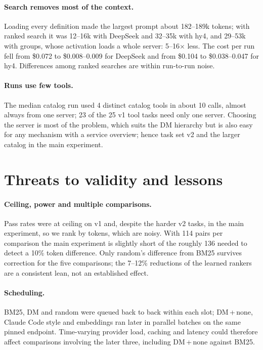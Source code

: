 \documentclass[11pt]{article}
\newcommand{\dmn}{DM\,+\,none}
\begin{document}
\paragraph{Search removes most of the context.} Loading every definition made the largest prompt about 182--189k
tokens; with ranked search it was 12--16k with DeepSeek and 32--35k with hy4, and 29--53k with groups, whose
activation loads a whole server: 5--16$\times$ less. The cost per run fell from \$0.072 to \$0.008--0.009 for
DeepSeek and from \$0.104 to \$0.038--0.047 for hy4. Differences among ranked searches are within run-to-run
noise.

\paragraph{Runs use few tools.} The median catalog run used 4 distinct catalog tools in about 10 calls, almost
always from one server; 23 of the 25 v1 tool tasks need only one server. Choosing the server is most of the
problem, which suits the DM hierarchy but is also easy for any mechanism with a service overview; hence task set v2
and the larger catalog in the main experiment.

\section{Threats to validity and lessons}\label{sec:threats}
\paragraph{Ceiling, power and multiple comparisons.} Pass rates were at ceiling on v1 and, despite the harder v2
tasks, in the main experiment, so we rank by tokens, which are noisy. With 114 pairs per comparison the main
experiment is slightly short of the roughly 136 needed to detect a 10\% token difference. Only random's difference
from BM25 survives correction for the five comparisons; the 7--12\% reductions of the learned rankers are a
consistent lean, not an established effect.

\paragraph{Scheduling.} BM25, DM and random were queued back to back within each slot; \dmn{}, Claude Code style
and embeddings ran later in parallel batches on the same pinned endpoint. Time-varying provider load, caching and
latency could therefore affect comparisons involving the later three, including \dmn{} against BM25.
\end{document}
